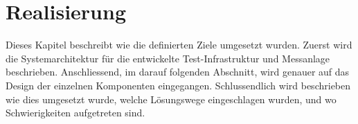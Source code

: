 \chapter{Realisierung}


Dieses Kapitel beschreibt wie die definierten Ziele umgesetzt wurden.
Zuerst wird die Systemarchitektur für die entwickelte Test-Infrastruktur und Messanlage beschrieben.
Anschliessend, im darauf folgenden Abschnitt, wird genauer auf das Design der einzelnen Komponenten eingegangen.
Schlussendlich wird beschrieben wie dies umgesetzt wurde, welche Lösungswege eingeschlagen wurden, und wo Schwierigkeiten aufgetreten sind.

